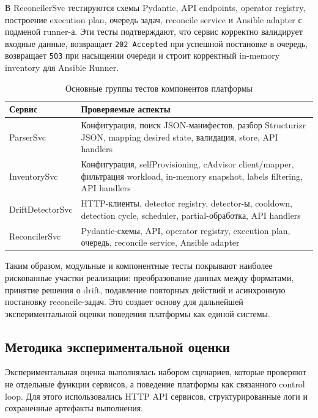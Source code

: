 В ReconcilerSvc тестируются схемы Pydantic, API endpoints, operator registry, построение execution plan, очередь задач, reconcile service и Ansible adapter с подменой runner-а. Эти тесты подтверждают, что сервис корректно валидирует входные данные, возвращает \texttt{202 Accepted} при успешной постановке в очередь, возвращает \texttt{503} при насыщении очереди и строит корректный in-memory inventory для Ansible Runner.

\begin{table}
    \centering
    \caption{Основные группы тестов компонентов платформы}
    \label{tab:ch4-test-groups}
    \footnotesize
    \begin{tabularx}{\textwidth}{|p{}|X|}\hline
    Сервис & Проверяемые аспекты \\ \hline
    ParserSvc & Конфигурация, поиск JSON-манифестов, разбор Structurizr JSON, mapping desired state, валидация, store, API handlers \\ \hline
    InventorySvc & Конфигурация, selfProvisioning, cAdvisor client/mapper, фильтрация workload, in-memory snapshot, labels filtering, API handlers \\ \hline
    DriftDetectorSvc & HTTP-клиенты, detector registry, detector-ы, cooldown, detection cycle, scheduler, partial-обработка, API handlers \\ \hline
    ReconcilerSvc & Pydantic-схемы, API, operator registry, execution plan, очередь, reconcile service, Ansible adapter \\ \hline
    \end{tabularx}
    \normalsize
\end{table}

Таким образом, модульные и компонентные тесты покрывают наиболее рискованные участки реализации: преобразование данных между форматами, принятие решения о drift, подавление повторных действий и асинхронную постановку reconcile-задач. Это создает основу для дальнейшей экспериментальной оценки поведения платформы как единой системы.

\subsection{Методика экспериментальной оценки}

Экспериментальная оценка выполнялась набором сценариев, которые проверяют не отдельные функции сервисов, а поведение платформы как связанного control loop. Для этого использовались HTTP API сервисов, структурированные логи и сохраненные артефакты выполнения.

